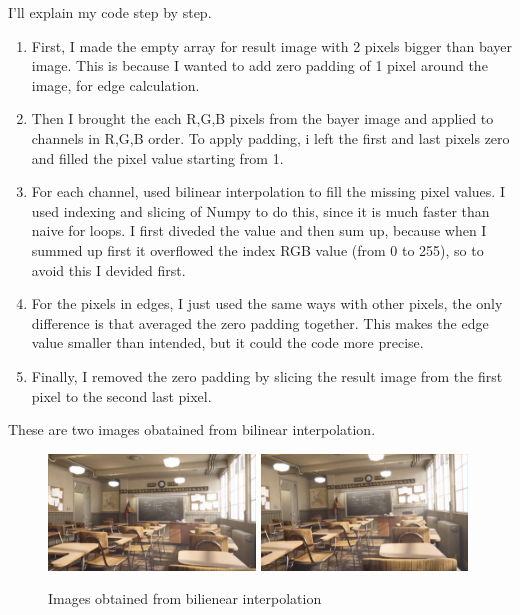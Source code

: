 I'll explain my code step by step. 


\begin{enumerate}
    \item First, I made the empty array for result image with 2 pixels bigger than bayer image. This is because I wanted to add zero padding of 1 pixel around the image, for edge calculation.
    \item Then I brought the each R,G,B pixels from the bayer image and applied to channels in R,G,B order. To apply padding, i left the first and last pixels zero and filled the pixel value starting from 1.
    \item For each channel, used bilinear interpolation to fill the missing pixel values. I used indexing and slicing of Numpy to do this, since it is much faster than naive for loops. I first diveded the value and then sum up, because when I summed up first it overflowed the index RGB value (from 0 to 255), so to avoid this I devided first.
    \item For the pixels in edges, I just used the same ways with other pixels, the only difference is that averaged the zero padding together. This makes the edge value smaller than intended, but it could the code more precise.
    \item Finally, I removed the zero padding by slicing the result image from the first pixel to the second last pixel.
\end{enumerate}

These are two images obatained from bilinear interpolation.

\begin{figure}
    \centering
    \includegraphics[width=5.5cm]{../result/bilinear_img1.png}
    \includegraphics[width=5.5cm]{../result/bilinear_img2.png}
\caption{Images obtained from bilienear interpolation}
\end{figure}

